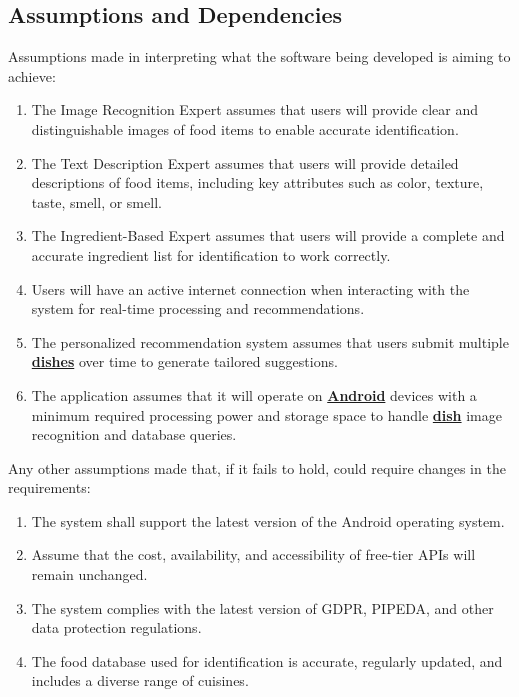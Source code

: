 \documentclass[]{article}
\begin{document}
\subsection{Assumptions and Dependencies}
\label{sub:assumptions_and_dependencies}
Assumptions made in interpreting what the software being developed is aiming to achieve:
	\begin{enumerate}
		\item The Image Recognition Expert assumes that users will provide clear and distinguishable images of food items to enable accurate identification.
		\item The Text Description Expert assumes that users will provide detailed descriptions of food items, including key attributes such as color, texture, taste, smell, or smell.
		\item The Ingredient-Based Expert assumes that users will provide a complete and accurate ingredient list for identification to work correctly.
		\item Users will have an active internet connection when interacting with the system for real-time processing and recommendations.
		\item The personalized recommendation system assumes that users submit multiple \hyperref[Dish]{\textbf{dishes}} over time to generate tailored suggestions.
		\item The application assumes that it will operate on \hyperref[Android]{\textbf{Android}} devices with a minimum required processing power and storage space to handle \hyperref[Dish]{\textbf{dish}} image recognition and database queries.
	\end{enumerate}

Any other assumptions made that, if it fails to hold, could require changes in the requirements:
	\begin{enumerate}
		\item The system shall support the latest version of the Android operating system.
		\item Assume that the cost, availability, and accessibility of free-tier APIs will remain unchanged.
		\item The system complies with the latest version of GDPR, PIPEDA, and other data protection regulations.
		\item The food database used for identification is accurate, regularly updated, and includes a diverse range of cuisines.
	\end{enumerate}

\end{document}
